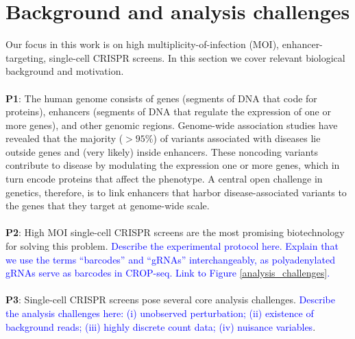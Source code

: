 \documentclass[12pt]{article}
\newcommand{\blue}[1]{\textcolor{blue}{#1}}
\begin{document}
\section{Background and analysis challenges}

Our focus in this work is on high multiplicity-of-infection (MOI), enhancer-targeting, single-cell CRISPR screens. In this section we cover relevant biological background and motivation.
\\ \\
\textbf{P1}: The human genome consists of genes (segments of DNA that code for proteins), enhancers (segments of DNA that regulate the expression of one or more genes), and other genomic regions. Genome-wide association studies have revealed that the majority ($>95\%$) of variants associated with diseases lie outside genes and (very likely) inside enhancers. These noncoding variants contribute to disease by modulating the expression one or more genes, which in turn encode proteins that affect the phenotype. A central open challenge in genetics, therefore, is to link enhancers that harbor disease-associated variants to the genes that they target at genome-wide scale.
\\ \\
\textbf{P2}: High MOI single-cell CRISPR screens are the most promising biotechnology for solving this problem. \blue{Describe the experimental protocol here. Explain that we use the terms ``barcodes'' and ``gRNAs'' interchangeably, as polyadenylated gRNAs serve as barcodes in CROP-seq. Link to Figure \ref{analysis_challenges}.}
\\ \\
\textbf{P3}: Single-cell CRISPR screens pose several core analysis challenges. \blue{Describe the analysis challenges here: (i) unobserved perturbation; (ii) existence of background reads; (iii) highly discrete count data; (iv) nuisance variables}.
\end{document}
